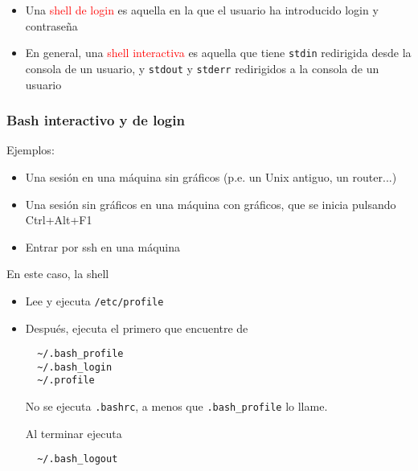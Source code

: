 \documentclass[ucs]{beamer}
\begin{document}
\begin{frame}[fragile]


\begin{itemize}
\item
Una 
\textcolor{red}{shell de login}
es aquella en la que el usuario ha introducido login y contraseña
\item
En general, una 
\textcolor{red}{shell interactiva}
es aquella que tiene 
\verb|stdin| redirigida desde la consola de un usuario,
y \verb|stdout| y \verb|stderr| redirigidos a la consola de un usuario
\end{itemize}
\end{frame}


\begin{frame}[fragile]
\frametitle{ Bash interactivo y de login }



Ejemplos: 
\begin{itemize}
\item
Una sesión en una máquina sin gráficos (p.e. un Unix antiguo, un router...)
\item
Una sesión sin gráficos en una máquina con gráficos, que se inicia pulsando  Ctrl+Alt+F1
\item
Entrar por ssh en una máquina
\end{itemize}


En este caso, la shell
\begin{itemize}
\item
Lee y ejecuta \verb|/etc/profile|
\item
Después, ejecuta el primero que encuentre de
\begin{verbatim}
  ~/.bash_profile 
  ~/.bash_login
  ~/.profile
\end{verbatim}
No se ejecuta \verb|.bashrc|, a menos que \verb|.bash_profile| lo llame.

Al terminar ejecuta
\begin{verbatim}
  ~/.bash_logout
\end{verbatim}

\end{itemize}

\end{frame}
\end{document}
